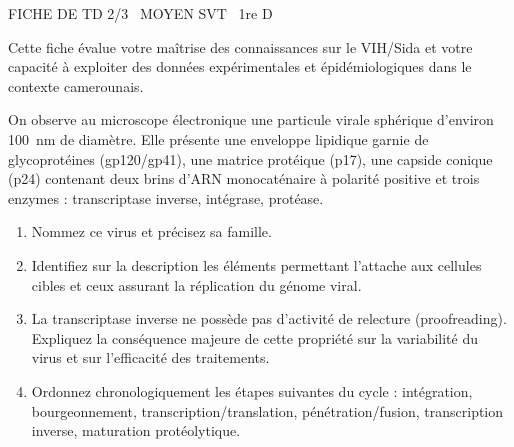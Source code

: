 \documentclass[11pt]{article}
\begin{document}
\begin{tcolorbox}[enhanced,colback=popink,colframe=popink,arc=10pt,boxrule=0pt,left=12pt,right=12pt,top=9pt,bottom=9pt]
{\color{white}\popxbold\small FICHE DE TD 2/3 \textbullet\ MOYEN \hfill SVT \textbullet\ 1re D\par}
\end{tcolorbox}
\vspace{4pt}
Cette fiche évalue votre maîtrise des connaissances sur le VIH/Sida et votre capacité à exploiter des données expérimentales et épidémiologiques dans le contexte camerounais.

\begin{exercice}
On observe au microscope électronique une particule virale sphérique d'environ \SI{100}{\nano\meter} de diamètre. Elle présente une enveloppe lipidique garnie de glycoprotéines (gp120/gp41), une matrice protéique (p17), une capside conique (p24) contenant deux brins d'ARN monocaténaire à polarité positive et trois enzymes : transcriptase inverse, intégrase, protéase.
\begin{enumerate}
    \item Nommez ce virus et précisez sa famille. 
    \item Identifiez sur la description les éléments permettant l'attache aux cellules cibles et ceux assurant la réplication du génome viral. 
    \item La transcriptase inverse ne possède pas d'activité de relecture (proofreading). Expliquez la conséquence majeure de cette propriété sur la variabilité du virus et sur l'efficacité des traitements. 
    \item Ordonnez chronologiquement les étapes suivantes du cycle : intégration, bourgeonnement, transcription/translation, pénétration/fusion, transcription inverse, maturation protéolytique.
\end{enumerate}
\end{exercice}
\end{document}
